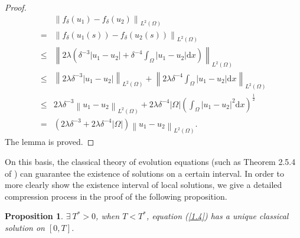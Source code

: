 \documentclass{article}
\numberwithin{equation}{section}
\newtheorem{proposition}[theorem]{Proposition}
\begin{document}
\begin{proof}
\begin{equation*}
\begin{aligned}
    &\left\|f_{\delta}(u_1)-f_{\delta}\left(u_2\right)\right\|_{L^{2}(\Omega)}
    \\ = &  \left\| f_{\delta}(u_1(s)) - f_{\delta}(u_2(s))  \right\|_{ L^{2}\left(\Omega\right)}
    \\ \le &   \left\|2 \lambda\left(\delta^{-3}\left|u_1-u_2\right|+\delta^{-4} \int_{\Omega}\left|u_1-u_2\right| \mathrm{d} x\right)\right\|_{ L^{2}\left(\Omega\right)}
    \\ \le &    \left\|2 \lambda\delta^{-3}\left|u_1-u_2\right|\right\|_{ L^{2}\left(\Omega\right)} + \left\|2 \lambda\delta^{-4} \int_{\Omega}\left|u_1-u_2\right| \mathrm{d} x\right\|_{ L^{2}\left(\Omega\right)}
    \\ \le &   2\lambda\delta^{-3}\left\|u_1-u_2\right\|_{ L^{2}\left(\Omega\right)} + 2\lambda\delta^{-4}|\Omega|\left(\int_{\Omega}\left|u_1-u_2\right|^2 \mathrm{d} x\right)^{\frac{1}{2}}
    \\ = &    \left( 2\lambda\delta^{-3} + 2\lambda\delta^{-4}|\Omega|\right)\left\|u_1-u_2\right\|_{ L^{2}\left(\Omega\right)}.
    \end{aligned}
    \end{equation*}
    The lemma is proved.
\end{proof}

On this basis, the classical theory of evolution equations (such as Theorem 2.5.4 of \cite{ref8}) can guarantee the existence of solutions on a certain interval. In order to more clearly show the existence interval of local solutions, we give a detailed compression process in the proof of the following proposition.

\begin{proposition}
    $\exists\  T^*>0$, when $T<T^*$, equation (\ref{1.4}) has a unique classical solution on $[0,T]$.
    \label{lem 01}
\end{proposition}
\end{document}
